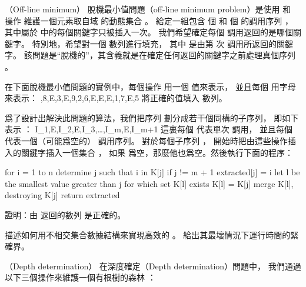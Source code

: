 \startsubject[
  title={Problems},
]

\startPROBLEM
（Off-line minimum）
{\EMP 脫機最小值問題}（off-line minimum problem）是使用  和  操作
維護一個元素取自域  的動態集合 。
給定一組包含  個  和  個  的調用序列 ，
其中屬於  中的每個關鍵字只被插入一次。
我們希望確定每個  調用返回的是哪個關鍵字。
特別地，希望對一個  數列進行填充，
其中  是由第  次  調用所返回的關鍵字。
該問題是“脫機的”，其含義就是在確定任何返回的關鍵字之前處理真個序列 。

\startigBase[a]\startitem
在下面脫機最小值問題的實例中，每個操作  用一個  值來表示，
並且每個  用字母  來表示：
,8,E,3,E,9,2,6,E,E,E,1,7,E,5
\stopformula
將正確的值填入  數列。
\stopitem\stopigBase

\startANSWER
{}
\stopANSWER

爲了設計出解決此問題的算法，我們把序列  劃分成若干個同構的子序列，
即如下表示 ：
\startformula
I_1,E,I_2,E,I_3,\ldots,I_m,E,I_{m+1}
\stopformula
這裏每個  代表單次  調用，
並且每個  代表一個（可能爲空的）  調用序列。
對於每個子序列 ，
開始時把由這些操作插入的關鍵字插入一個集合 ，
如果  爲空，那麼他也爲空。然後執行下面的程序：

\startCLRS
for i = 1 to n
	determine j such that i in K[j]
	if j != m + 1
		extracted[j] = i
		let l be the smallest value greater than j
			for which set K[l] exists
		K[l] = K[j] merge K[l], destroying K[j]
return extracted
\stopCLRS

\startigBase[continue]\startitem
證明：由  返回的數列  是正確的。
\stopitem\stopigBase

\startANSWER
{}
\stopANSWER

\startigBase[continue]\startitem
描述如何用不相交集合數據結構來實現高效的 。
給出其最壞情況下運行時間的緊確界。
\stopitem\stopigBase

\startANSWER
{}
\stopANSWER

\stopPROBLEM

\startPROBLEM
（Depth determination）
在{\EMP 深度確定}（Depth determination）問題中，
我們通過以下三個操作來維護一個有根樹的森林 ：

